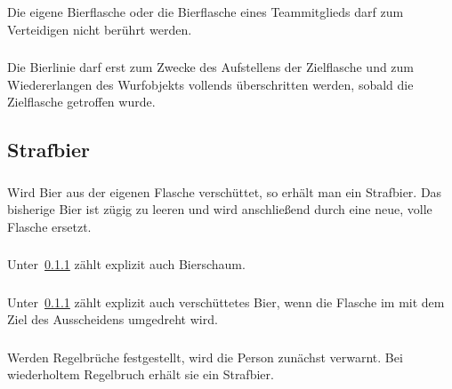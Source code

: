 \subsubsection{}
Die eigene Bierflasche oder die Bierflasche eines Teammitglieds darf zum Verteidigen nicht berührt werden.

\subsubsection{}
Die Bierlinie darf erst zum Zwecke des Aufstellens der Zielflasche und zum Wiedererlangen des Wurfobjekts vollends überschritten werden, sobald die Zielflasche getroffen wurde.

\subsection{Strafbier}
\subsubsection{}\label{Flunkyball:Strafbier:Allg}
Wird Bier aus der eigenen Flasche verschüttet, so erhält man ein Strafbier.
Das bisherige Bier ist zügig zu leeren und wird anschließend durch eine neue, volle Flasche ersetzt.

\subsubsection{}
Unter~\ref{Flunkyball:Strafbier:Allg} zählt explizit auch Bierschaum.

\subsubsection{}
Unter~\ref{Flunkyball:Strafbier:Allg} zählt explizit auch verschüttetes Bier, wenn die Flasche im mit dem Ziel des Ausscheidens umgedreht wird.

\subsubsection{}
Werden Regelbrüche festgestellt, wird die Person zunächst verwarnt.
Bei wiederholtem Regelbruch erhält sie ein Strafbier.
